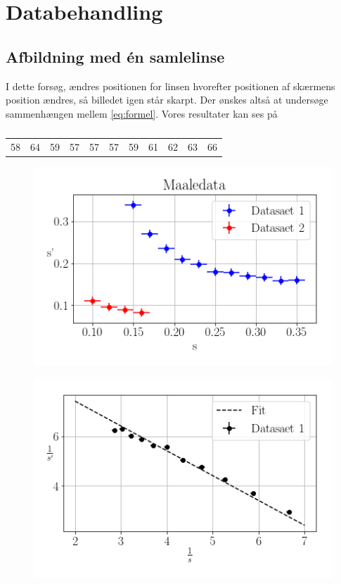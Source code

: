 \section{Databehandling}
\subsection{Afbildning med én samlelinse}
I dette forsøg, ændres positionen for linsen hvorefter positionen af skærmens position ændres, så billedet igen står skarpt. Der ønskes altså at undersøge sammenhængen mellem \cref{eq:formel}.
Vores resultater kan ses på
\begin{table}[H]
    \begin{tabular}{c|c|c|c|c|c|c|c|c|c|c}
        58 &  64 &  59 &  57 &  57 &  57  & 59  & 61  & 62  & 63  & 66
    \end{tabular}
    \caption{}
    \label{}
\end{table}
\begin{figure}[H]
    \includegraphics[width=\linewidth]{usikkerhed.png}
    \caption{}
    \label{fig:usikkerhed}
\end{figure}

\begin{figure}[H]
    \includegraphics[width=\linewidth]{1.png}
    \caption{}
    \label{fig:1}
\end{figure}

